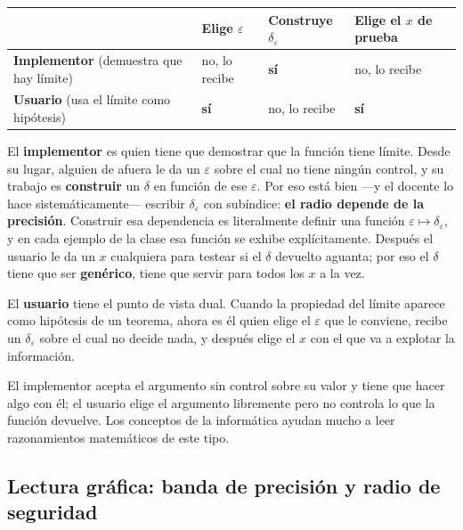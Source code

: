 \documentclass[12pt,a4paper]{article}
\begin{document}
\begin{center}
\begin{tabularx}{\textwidth}{@{}lXXX@{}}
\toprule
 & Elige $\varepsilon$ & Construye $\delta_\varepsilon$ & Elige el $x$ de prueba \\
\midrule
\textbf{Implementor} (demuestra que hay límite) & no, lo recibe & \textbf{sí} & no, lo recibe \\
\textbf{Usuario} (usa el límite como hipótesis) & \textbf{sí} & no, lo recibe & \textbf{sí} \\
\bottomrule
\end{tabularx}
\end{center}

El \textbf{implementor} es quien tiene que demostrar que la función tiene
límite. Desde su lugar, alguien de afuera le da un $\varepsilon$ sobre el cual
no tiene ningún control, y su trabajo es \textbf{construir} un $\delta$ en
función de ese $\varepsilon$. Por eso está bien ---y el docente lo hace
sistemáticamente--- escribir $\delta_\varepsilon$ con subíndice: \textbf{el
radio depende de la precisión}. Construir esa dependencia es literalmente
definir una función $\varepsilon \mapsto \delta_\varepsilon$, y en cada ejemplo
de la clase esa función se exhibe explícitamente. Después el usuario le da un
$x$ cualquiera para testear si el $\delta$ devuelto aguanta; por eso el
$\delta$ tiene que ser \textbf{genérico}, tiene que servir para todos los $x$ a
la vez.

El \textbf{usuario} tiene el punto de vista dual. Cuando la propiedad del
límite aparece como hipótesis de un teorema, ahora es él quien elige el
$\varepsilon$ que le conviene, recibe un $\delta_\varepsilon$ sobre el cual no
decide nada, y después elige el $x$ con el que va a explotar la información.

\begin{notebox}
El implementor acepta el argumento sin control sobre su valor y tiene que
hacer algo con él; el usuario elige el argumento libremente pero no controla
lo que la función devuelve. Los conceptos de la informática ayudan mucho a
leer razonamientos matemáticos de este tipo.
\end{notebox}

\subsection{Lectura gráfica: banda de precisión y radio de seguridad}
\end{document}

